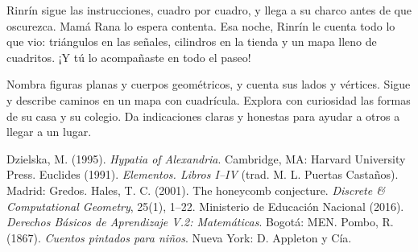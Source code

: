 \documentclass[11pt]{article}
\begin{document}

Rinrín sigue las instrucciones, cuadro por cuadro, y llega a su charco
antes de que oscurezca. Mamá Rana lo espera contenta. Esa noche, Rinrín le
cuenta todo lo que vio: triángulos en las señales, cilindros en la tienda
y un mapa lleno de cuadritos. ¡Y tú lo acompañaste en todo el paseo!

\matrizevaluacion
  {Nombra figuras planas y cuerpos geométricos, y cuenta sus lados y vértices.}
  {Sigue y describe caminos en un mapa con cuadrícula.}
  {Explora con curiosidad las formas de su casa y su colegio.}
  {Da indicaciones claras y honestas para ayudar a otros a llegar a un lugar.}

\autoevaluacion

\seguimientodocente

\begin{referencias}
 Dzielska, M. (1995). \emph{Hypatia of Alexandria}.
  Cambridge, MA: Harvard University Press.
 Euclides (1991). \emph{Elementos. Libros I--IV}
  (trad. M. L. Puertas Castaños). Madrid: Gredos.
 Hales, T. C. (2001). The honeycomb conjecture.
  \emph{Discrete \& Computational Geometry}, 25(1), 1--22.
 Ministerio de Educación Nacional (2016). \emph{Derechos
  Básicos de Aprendizaje V.2: Matemáticas}. Bogotá: MEN.
 Pombo, R. (1867). \emph{Cuentos pintados para niños}.
  Nueva York: D. Appleton y Cía.
\end{referencias}
\end{document}
